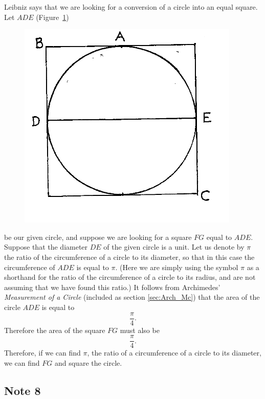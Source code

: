 \documentclass[polutonikogreek,english,twoside,openright]{article}
\begin{document}
Leibniz says that we are looking for a conversion of a circle into an
equal square.  Let $ADE$ (Figure~\ref{circsquare})
\begin{figure}[htp]
  \begin{center}
    \includegraphics[width=.5\textwidth]{fig/Figure58}
    \caption{}
    \label{circsquare}
    \vspace{-10pt}
  \end{center}
\end{figure} be our given circle, and suppose we are looking for a
square $FG$ equal to $ADE$.  Suppose that the diameter $DE$ of the
given circle is a unit.  Let us denote by $\pi$ the ratio of the
circumference of a circle to its diameter, so that in this case the
circumference of $ADE$ is equal to $\pi$.  (Here we are simply using
the symbol $\pi$ as a shorthand for the ratio of the circumference of
a circle to its radius, and are not assuming that we have found this
ratio.)  It follows from Archimedes' {\em Measurement of a Circle}
(included as section \ref{sec:Arch_Mc}) that the area of the circle $ADE$
is equal to
$$\frac{\pi}{4}.$$
Therefore the area of the square $FG$ must also be 
$$\frac{\pi}{4}.$$
Therefore, if we can find $\pi$, the ratio of a circumference of a
circle to its diameter, we can find $FG$ and square the circle.

\subsection*{Note 8}
\label{ctp8}
\end{document}
